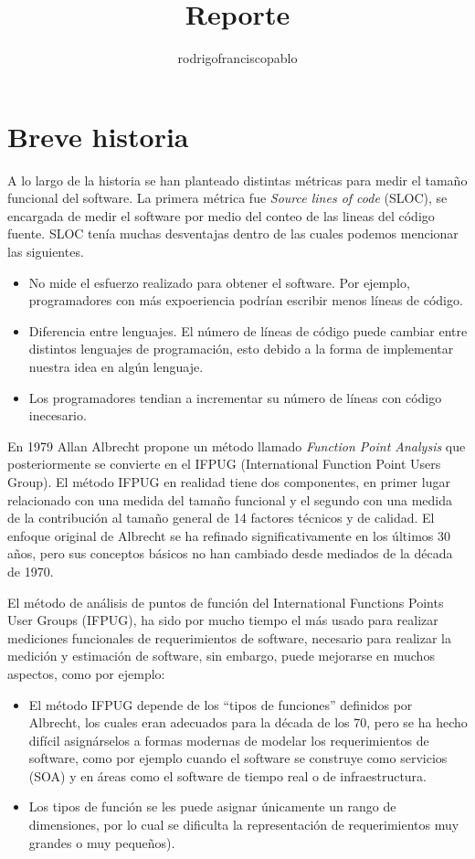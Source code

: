 \documentclass{mylib/reporteCorto}
\title{Reporte}
\author{rodrigofranciscopablo }
\begin{document}
\coverPage


\tableofcontents

\section{Breve historia}

A lo largo de la historia se han planteado distintas métricas para medir el tamaño funcional del software. La primera métrica fue \textit{Source lines of code} (SLOC), se encargada de medir el software por medio del conteo de las lineas del código fuente. SLOC tenía muchas desventajas dentro de las cuales podemos mencionar las siguientes. 
\begin{itemize}
	\item No mide el esfuerzo realizado para obtener el software. Por ejemplo, programadores con más expoeriencia podrían escribir menos líneas de código.
	\item Diferencia entre lenguajes. El número de líneas de código puede cambiar entre distintos lenguajes de programación, esto debido a la forma de implementar nuestra idea en algún lenguaje.
	\item Los programadores tendian a incrementar su número de líneas con código inecesario.
\end{itemize}

En 1979 Allan Albrecht propone un método llamado \textit{Function Point Analysis} que posteriormente se convierte en el IFPUG (International Function Point Users Group). El método IFPUG en realidad tiene dos componentes, en primer lugar relacionado con una medida del tamaño funcional y el segundo con una medida de la contribución al tamaño general de 14 factores técnicos y de calidad. El enfoque original de Albrecht se ha refinado significativamente en los últimos 30 años, pero sus conceptos básicos no han cambiado desde mediados de la década de 1970.

El método de análisis de puntos de función del International Functions Points User Groups (IFPUG), ha sido por mucho tiempo el más usado para realizar mediciones funcionales de requerimientos de software, necesario para realizar la medición y estimación de software, sin embargo, puede mejorarse en muchos aspectos, como por ejemplo:

\begin{itemize}
	\item El método IFPUG depende de los “tipos de funciones” definidos por Albrecht, los cuales eran adecuados para la década de los 70, pero se ha hecho difícil asignárselos a formas modernas de modelar los requerimientos de software, como por ejemplo cuando el software se construye como servicios (SOA) y en áreas como el software de tiempo real o de infraestructura.
	\item Los tipos de función se les puede asignar únicamente un rango de dimensiones, por lo cual se dificulta la representación de requerimientos muy grandes o muy pequeños).
\end{itemize}
\end{document}
